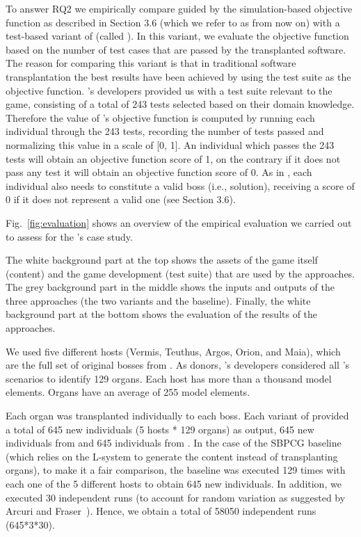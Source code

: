 To answer RQ2 we empirically compare \ApproachName guided by the simulation-based objective function as described in Section 3.6 (which we refer to \simhotep{} as from now on) with  a test-based variant of \ApproachName{} (called \timhotep{}). In this variant, we evaluate the objective function based on the number of test cases that are passed by the transplanted software. 
The reason for comparing this variant is that in traditional software transplantation the best results have been achieved by using the test suite as the objective function. 
\CaseStudy{}'s developers provided us with a test suite relevant to the game, consisting of a total of 243 tests selected based on their domain knowledge. 
Therefore the value of \timhotep{}'s objective function is computed by running each individual through the 243 tests, recording the number of tests passed and normalizing this value in a scale of [0, 1]. 
An individual which passes the 243 tests will obtain an objective function score of 1, on the contrary if it does not pass any test it will obtain an objective function score of 0.  
As in \simhotep{},  each individual also needs to constitute a valid boss (i.e., solution), receiving a score of 0 if it does not represent a valid one (see Section 3.6).

Fig.~\ref{fig:evaluation} shows an overview of the empirical evaluation we carried out to assess \ApproachName for the \CaseStudy's case study.

The white background part at the top shows the assets of the game itself (content) and the game development (test suite) that are used by the approaches. The grey background part in the middle shows the inputs and outputs of the three approaches (the two \ApproachName{} variants and the baseline). Finally, the white background part at the bottom shows the evaluation of the results of the approaches.

We used five different hosts (Vermis, Teuthus, Argos, Orion, and Maia), which are the full set of original bosses from \CaseStudy{}. As donors, \CaseStudy{}'s developers considered all \CaseStudy{}'s scenarios to identify 129 organs. Each host has more than a thousand model elements. Organs have an average of 255 model elements.

Each organ was transplanted individually to each boss. Each variant of \ApproachName{} provided a total of 645 new individuals (5 hosts * 129 organs) as output, 645 new individuals from \simhotep{} and 645 individuals from \timhotep{}. In the case of the SBPCG baseline (which relies on the L-system to generate the content instead of transplanting organs), to make it a fair comparison, the baseline was executed 129 times with each one of the 5 different hosts to obtain 645 new individuals. In addition, we executed 30 independent runs (to account for random variation as suggested by Arcuri and Fraser~\cite{arcuri2013parameter}). Hence, we obtain a total of 58050 independent runs (645*3*30).


